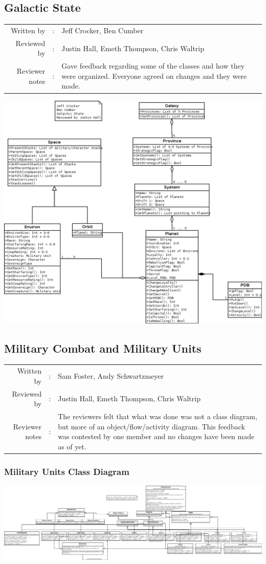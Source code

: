 \documentclass[12pt,letterpaper]{article}
\begin{document}
	\subsection{Galactic State}
	\begin{tabularx}{\linewidth}{rcX}
				Written by & : & Jeff Crocker, Ben Cumber \\
				Reviewed by & : & Justin Hall, Emeth Thompson, Chris Waltrip \\
				Reviewer notes & : & Gave feedback regarding some of the classes and how they were organized.  Everyone agreed on changes and they were made. 
	\end{tabularx}
		\includegraphics[width=\textwidth,height=\textheight,keepaspectratio]{./images/galactic_state}
		\pagebreak	
	\subsection{Military Combat and Military Units}
	\begin{tabularx}{\linewidth}{rcX}
				Written by & : & Sam Foster, Andy Schwartzmeyer \\
				Reviewed by & : & Justin Hall, Emeth Thompson, Chris Waltrip \\
				Reviewer notes & : & The reviewers felt that what was done was not a class diagram, but more of an object/flow/activity diagram.  This feedback was contested by one member and no changes have been made as of yet.
	\end{tabularx}
		\subsubsection{Military Units Class Diagram}
		\includegraphics[width=\textwidth,height=\textheight,keepaspectratio]{./images/military_units}
		
\end{document}

